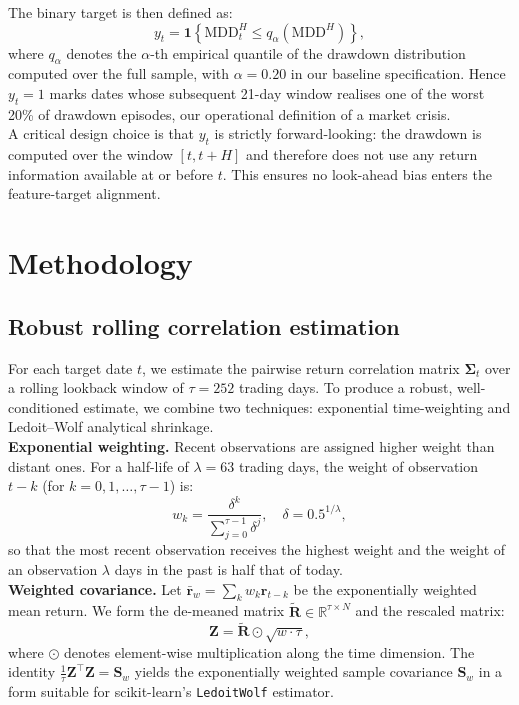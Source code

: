 \documentclass{article}
\begin{document}
The binary target is then defined as:
\begin{equation}
    y_t = \mathbf{1}\!\left\{ \text{MDD}_{t}^{H} \leq q_{\alpha}\!\left(\text{MDD}^{H}\right) \right\},
\end{equation}
where $q_{\alpha}$ denotes the $\alpha$-th empirical quantile of the drawdown distribution computed over the full sample, with $\alpha = 0.20$ in our baseline specification. Hence $y_t = 1$ marks dates whose subsequent 21-day window realises one of the worst 20\% of drawdown episodes, our operational definition of a market crisis.\\

A critical design choice is that $y_t$ is strictly forward-looking: the drawdown is computed over the window $[t, t+H]$ and therefore does not use any return information available at or before $t$. This ensures no look-ahead bias enters the feature-target alignment.


\section{Methodology}
\label{sec:methodology}

\subsection{Robust rolling correlation estimation}

For each target date $t$, we estimate the pairwise return correlation matrix $\boldsymbol{\Sigma}_t$ over a rolling lookback window of $\tau = 252$ trading days. To produce a robust, well-conditioned estimate, we combine two techniques: exponential time-weighting and Ledoit--Wolf analytical shrinkage.\\

\noindent\textbf{Exponential weighting.} Recent observations are assigned higher weight than distant ones. For a half-life of $\lambda = 63$ trading days, the weight of observation $t - k$ (for $k = 0, 1, \ldots, \tau-1$) is:
\begin{equation}
    w_k = \frac{\delta^k}{\sum_{j=0}^{\tau-1} \delta^j}, \quad \delta = 0.5^{1/\lambda},
\end{equation}
so that the most recent observation receives the highest weight and the weight of an observation $\lambda$ days in the past is half that of today.\\

\noindent\textbf{Weighted covariance.} Let $\bar{\mathbf{r}}_w = \sum_k w_k \mathbf{r}_{t-k}$ be the exponentially weighted mean return. We form the de-meaned matrix $\tilde{\mathbf{R}} \in \mathbb{R}^{\tau \times N}$ and the rescaled matrix:
\begin{equation}
    \mathbf{Z} = \tilde{\mathbf{R}} \odot \sqrt{w \cdot \tau},
\end{equation}
where $\odot$ denotes element-wise multiplication along the time dimension. The identity $\frac{1}{\tau}\mathbf{Z}^\top\mathbf{Z} = \mathbf{S}_w$ yields the exponentially weighted sample covariance $\mathbf{S}_w$ in a form suitable for scikit-learn's \texttt{LedoitWolf} estimator.\\
\end{document}
